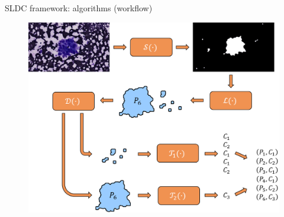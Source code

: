 \documentclass{beamer}
\begin{document}
\begin{frame}{SLDC framework: algorithms (workflow)}
	\begin{figure}
		\includegraphics[scale=0.45]{images/workflow_illustration.png}
	\end{figure}
\end{frame}
\end{document}
